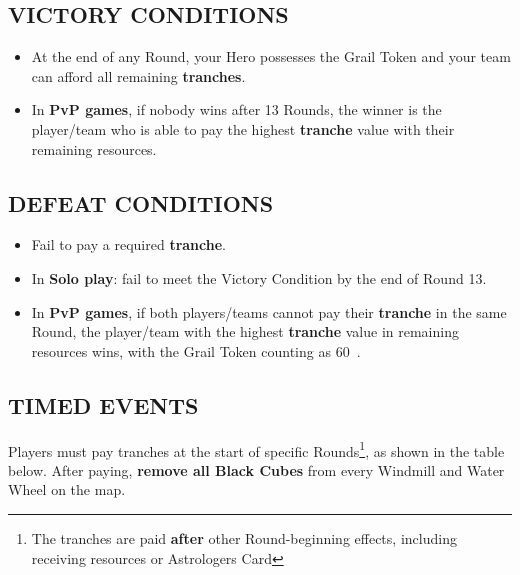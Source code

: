 \begin{multicols*}{2}
\subsection*{\MakeUppercase{Victory Conditions}}

\begin{itemize}
  \item At the end of any Round, your Hero possesses the Grail Token and your team can afford all remaining \textbf{tranches}.
  \item In \textbf{PvP games}, if nobody wins after 13 Rounds, the winner is the player/team who is able to pay the highest \textbf{tranche} value with their remaining resources.
\end{itemize}

\vspace*{\fill}
\columnbreak

\subsection*{\MakeUppercase{Defeat Conditions}}

\begin{itemize}
  \item Fail to pay a required \textbf{tranche}.
  \item In \textbf{Solo play}: fail to meet the Victory Condition by the end of Round 13.
  \item In \textbf{PvP games}, if both players/teams cannot pay their \textbf{tranche} in the same Round, the player/team with the highest \textbf{tranche} value in remaining resources wins, with the Grail Token counting as 60~.
\end{itemize}

\subsection*{\MakeUppercase{Timed Events}}

Players must pay tranches at the start of specific Rounds\footnote{The tranches are paid \textbf{after} other Round-beginning effects, including receiving resources or Astrologers Card}, as shown in the table below. After paying, \textbf{remove all Black Cubes} from every Windmill and Water Wheel on the map.

\medskip


\end{multicols*}
